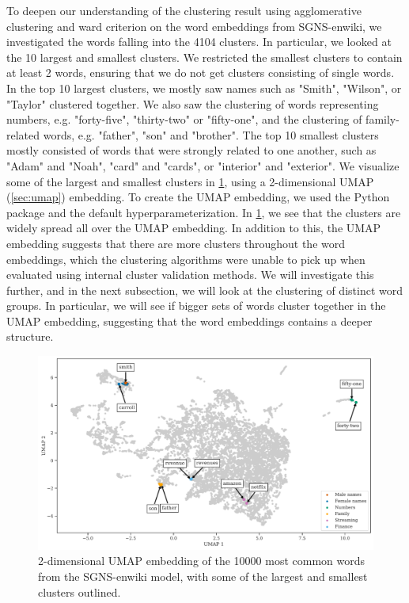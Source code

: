 To deepen our understanding of the clustering result using agglomerative clustering and ward criterion on the word embeddings from SGNS-enwiki, we investigated the words falling into the 4104 clusters. In particular, we looked at the 10 largest and smallest clusters. We restricted the smallest clusters to contain at least 2 words, ensuring that we do not get clusters consisting of single words. In the top 10 largest clusters, we mostly saw names such as "Smith", "Wilson", or "Taylor" clustered together. We also saw the clustering of words representing numbers, e.g. "forty-five", "thirty-two" or "fifty-one", and the clustering of family-related words, e.g. "father", "son" and "brother". The top 10 smallest clusters mostly consisted of words that were strongly related to one another, such as "Adam" and "Noah", "card" and "cards", or "interior" and "exterior". We visualize some of the largest and smallest clusters in \cref{fig:cluster-analysis-agglomerative-2d-umap-top-clusters}, using a 2-dimensional UMAP (\cref{sec:umap}) embedding. To create the UMAP embedding, we used the  Python package \cite{mcinnes2018umap-software} and the default hyperparameterization. In \cref{fig:cluster-analysis-agglomerative-2d-umap-top-clusters}, we see that the clusters are widely spread all over the UMAP embedding. In addition to this, the UMAP embedding suggests that there are more clusters throughout the word embeddings, which the clustering algorithms were unable to pick up when evaluated using internal cluster validation methods. We will investigate this further, and in the next subsection, we will look at the clustering of distinct word groups. In particular, we will see if bigger sets of words cluster together in the UMAP embedding, suggesting that the word embeddings contains a deeper structure.
\begin{figure}
    \centering
    \includegraphics[width=\textwidth]{thesis/figures/cluster-analysis-agglomerative-2d-umap-top-clusters.pdf}
    \caption{2-dimensional UMAP embedding of the 10000 most common words from the SGNS-enwiki model, with some of the largest and smallest clusters outlined.}
    \label{fig:cluster-analysis-agglomerative-2d-umap-top-clusters}
\end{figure}

